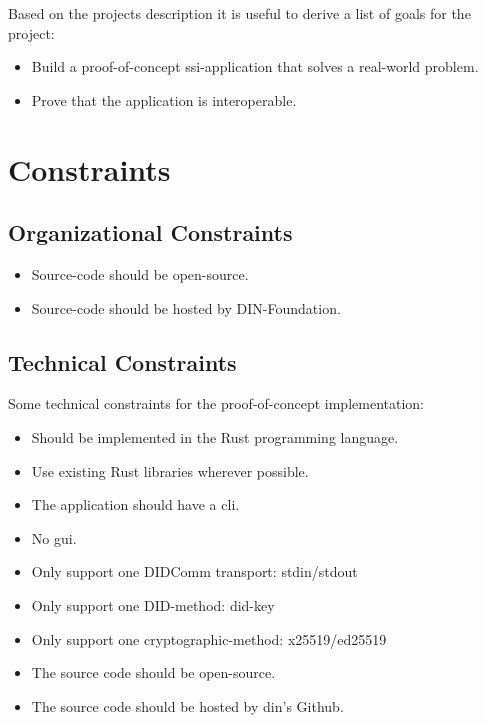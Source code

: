 Based on the projects description it is useful to derive a list of goals for the project:

\begin{itemize}
    \item Build a proof-of-concept \acrshort{ssi}-application that solves a real-world problem.
    \item Prove that the application is interoperable.
\end{itemize}

\section{Constraints}

\subsection{Organizational Constraints}

\begin{itemize}
    \item Source-code should be open-source.
    \item Source-code should be hosted by DIN-Foundation.
\end{itemize}

\subsection{Technical Constraints}
Some technical constraints for the proof-of-concept implementation:

\begin{itemize}
    \item Should be implemented in the Rust programming language.
    \item Use existing Rust libraries wherever possible.
    \item The application should have a \acrfull{cli}.
    \item No \acrfull{gui}.
    \item Only support one DIDComm transport: \acrshort{stdin}/\acrshort{stdout}
    \item Only support one DID-method: \gls{did-key}
    \item Only support one cryptographic-method: x25519/ed25519
    \item The source code should be open-source.
    \item The source code should be hosted by \acrshort{din}'s Github.
\end{itemize}



